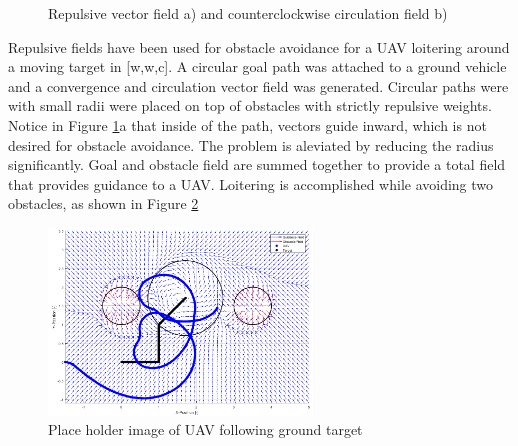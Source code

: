 \documentclass[numbered,pdftex]{ohio-etd}
\begin{document}
\begin{figure}[]
	\begin{subfigmatrix}{2}%
		\centering	
		\hspace*{0mm}
	\end{subfigmatrix}
	\caption{Repulsive vector field a) and counterclockwise circulation field b)}
	\label{fig:negativeUnity}
\end{figure}

Repulsive fields have been used for obstacle avoidance for a UAV loitering around a moving target in [w,w,c]. A circular goal path was attached to a ground vehicle and a convergence and circulation vector field was generated. Circular paths were with small radii were placed on top of obstacles with strictly repulsive weights. Notice in Figure \ref{fig:negativeUnity}a that inside of the path, vectors guide inward, which is not desired for obstacle avoidance. The problem is aleviated by reducing the radius significantly. Goal and obstacle field are summed together to provide a total field that provides guidance to a UAV. Loitering is accomplished while avoiding two obstacles, as shown in Figure  \ref{fig:gvfMovingTarget} 

\begin{figure}[h]
	\centering
	\includegraphics[width=7cm]{PaperFigures/gvfMovingTarget}
	\caption{Place holder image of UAV following ground target}
	\label{fig:gvfMovingTarget}
\end{figure}
\end{document}
